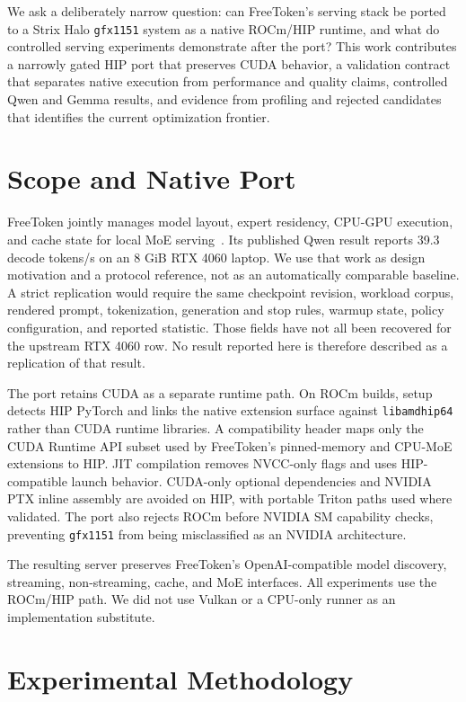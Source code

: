 \documentclass[10pt,letterpaper,twocolumn]{article}
\begin{document}
We ask a deliberately narrow question: can FreeToken's serving stack be ported to a Strix Halo \texttt{gfx1151} system as a native ROCm/HIP runtime, and what do controlled serving experiments demonstrate after the port? This work contributes a narrowly gated HIP port that preserves CUDA behavior, a validation contract that separates native execution from performance and quality claims, controlled Qwen and Gemma results, and evidence from profiling and rejected candidates that identifies the current optimization frontier.

\section{Scope and Native Port}

FreeToken jointly manages model layout, expert residency, CPU-GPU execution, and cache state for local MoE serving~\cite{freetoken}. Its published Qwen result reports 39.3 decode tokens/s on an 8 GiB RTX 4060 laptop. We use that work as design motivation and a protocol reference, not as an automatically comparable baseline. A strict replication would require the same checkpoint revision, workload corpus, rendered prompt, tokenization, generation and stop rules, warmup state, policy configuration, and reported statistic. Those fields have not all been recovered for the upstream RTX 4060 row. No result reported here is therefore described as a replication of that result.

The port retains CUDA as a separate runtime path. On ROCm builds, setup detects HIP PyTorch and links the native extension surface against \texttt{libamdhip64} rather than CUDA runtime libraries. A compatibility header maps only the CUDA Runtime API subset used by FreeToken's pinned-memory and CPU-MoE extensions to HIP. JIT compilation removes NVCC-only flags and uses HIP-compatible launch behavior. CUDA-only optional dependencies and NVIDIA PTX inline assembly are avoided on HIP, with portable Triton paths used where validated. The port also rejects ROCm before NVIDIA SM capability checks, preventing \texttt{gfx1151} from being misclassified as an NVIDIA architecture.

The resulting server preserves FreeToken's OpenAI-compatible model discovery, streaming, non-streaming, cache, and MoE interfaces. All experiments use the ROCm/HIP path. We did not use Vulkan or a CPU-only runner as an implementation substitute.

\section{Experimental Methodology}
\end{document}
